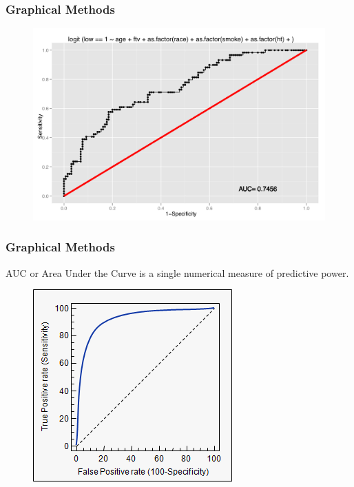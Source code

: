 \documentclass[PredictiveAnalytics101.tex]{subfiles}
\begin{document}
 



\begin{frame}
	\frametitle{Graphical Methods}
	\Large
\begin{figure}
\centering
\includegraphics[width=0.99\linewidth]{images/LROCPlot}

\end{figure}
\end{frame}
\begin{frame}
\frametitle{Graphical Methods}
\Large
	AUC or Area Under the Curve is a single numerical measure of predictive power.
\begin{figure}
\centering
\includegraphics[width=0.99\linewidth]{images/ROC1}
\end{figure}
	
	
\end{frame}
\end{document}
